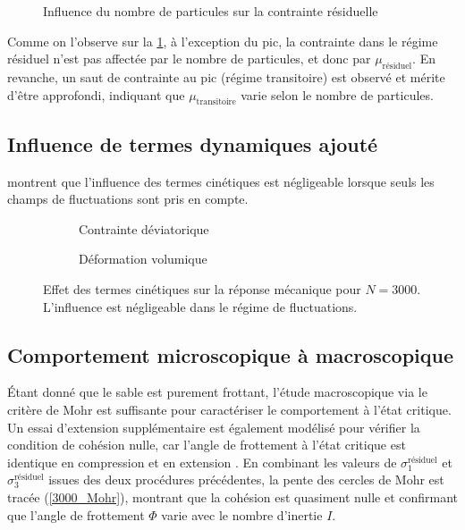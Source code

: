 \documentclass[5p,authoryear,square]{elsarticle}
\begin{document}
\begin{figure}[htbp]
    \centering
    \scalebox{0.5}{}
    \caption{Influence du nombre de particules sur la contrainte résiduelle}
    \label{comparerNP}
\end{figure}

Comme on l'observe sur la \cref{comparerNP}, à l'exception du pic, la contrainte dans le régime résiduel n'est pas affectée par le nombre de particules, et donc par $\mu_{\text{résiduel}}$.
En revanche, un saut de contrainte au pic (régime transitoire) est observé et mérite d'être approfondi, indiquant que $\mu_{\text{transitoire}}$ varie selon le nombre de particules.

\subsection{Influence de termes dynamiques ajouté}\label{termeDynamique}

 montrent que l'influence des termes cinétiques est négligeable lorsque seuls les champs de fluctuations sont pris en compte.
\begin{figure}[htbp]
    \centering
    \begin{subfigure}{0.45\textwidth}
        \centering
        \scalebox{0.5}{}
        \caption{Contrainte déviatorique}
        \label{3000_kinetic_q}
    \end{subfigure}
    \hfill
    \begin{subfigure}{0.45\textwidth}
        \centering
        \scalebox{0.5}{}
        \caption{Déformation volumique}
        \label{3000_kinetic_ev}
    \end{subfigure}
    \caption{Effet des termes cinétiques sur la réponse mécanique pour $N=3000$. L'influence est négligeable dans le régime de fluctuations.}
    \label{3000_kinetic_comp}
\end{figure}

\subsection{Comportement microscopique à macroscopique}\label{figureMuy}

Étant donné que le sable est purement frottant, l'étude macroscopique via le critère de Mohr est suffisante pour caractériser le comportement à l'état critique.
Un essai d'extension supplémentaire est également modélisé pour vérifier la condition de cohésion nulle, car l'angle de frottement à l'état critique est identique en compression et en extension \citep{gens1982degree}.
En combinant les valeurs de $\sigma_1^{\text{résiduel}}$ et $\sigma_3^{\text{résiduel}}$ issues des deux procédures précédentes, la pente des cercles de Mohr est tracée (\cref{3000_Mohr}), montrant que la cohésion est quasiment nulle et confirmant que l'angle de frottement $\Phi$ varie avec le nombre d'inertie $I$.
\end{document}
